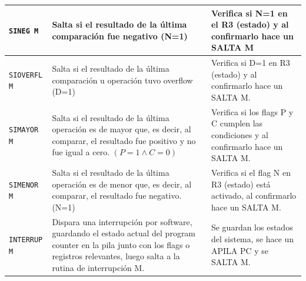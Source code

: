 \documentclass{article}
\begin{document}
\begin{longtable}{|p{}|p{}|p{}|}
  \hline
  \texttt{SINEG M}            & Salta si el resultado de la última comparación fue negativo (N=1)                                                                                                                                                                                                                               & Verifica si N=1 en el R3 (estado) y al confirmarlo hace un SALTA M                    \\
  \hline
  \texttt{SIOVERFL M}         & Salta si el resultado de la última comparación u operación tuvo overflow (D=1)                                                                                                                                                                                                                  & Verifica si D=1 en R3 (estado) y al confirmarlo hace un SALTA M.                      \\
  \hline
  \texttt{SIMAYOR M}          & Salta si el resultado de la última operación es de mayor que, es decir, al comparar, el resultado fue positivo y no fue igual a cero. $(P = 1 \land C = 0)$                                                                                                                                     & Verifica si los flags P y C cumplen las condiciones y al confirmarlo hace un SALTA M. \\
  \hline
  \texttt{SIMENOR M}          & Salta si el resultado de la última operación es de menor que, es decir, al comparar, el resultado fue negativo. (N=1)                                                                                                                                                                           & Verifica si el flag N en R3 (estado) está activado, al confirmarlo hace un SALTA M.   \\
  \hline
  \texttt{INTERRUP M}         & Dispara una interrupción por software, guardando el estado actual del program counter en la pila junto con los flags o registros relevantes, luego salta a la rutina de interrupción M.                                                                                                         & Se guardan los estados del sistema, se hace un APILA PC y se SALTA M.                 \\
  \hline
\end{longtable}


\end{document}
